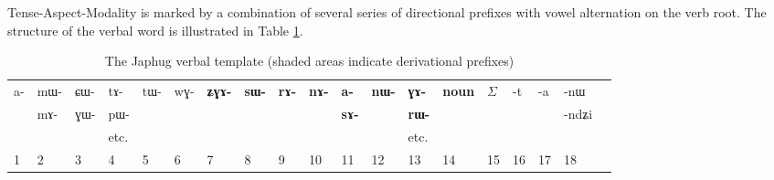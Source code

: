 \documentclass[oldfontcommands,twoside,a4paper,12pt]{article}
\newcommand{\ipab}[1]{{\phon #1}}
\newcommand{\grise}[1]{\cellcolor{lightgray}\textbf{#1}}
\begin{document}
 Tense-Aspect-Modality is marked by a combination of several series of directional prefixes with vowel alternation on the verb root. The structure of the verbal word is illustrated in Table \ref{tab:template:derivational}.
 
   \begin{landscape}
\begin{table}[h]
\caption{The Japhug verbal template (shaded areas indicate derivational prefixes)}\label{tab:template:derivational}
\begin{tabular}{llllll|llllllll|lllll} \toprule
 
\ipab{a-}  &  	\ipab{mɯ- }   &  	\ipab{ɕɯ-}   &\ipab{tɤ-} &  	\ipab{tɯ-}  &  	\ipab{wɣ-}   &

  	 \grise{\ipab{ʑɣɤ-}}  &  	\grise{\ipab{sɯ-}}  & \grise{\ipab{rɤ-}}& \grise{\ipab{nɤ-}} &   	 \grise{\ipab{a-}}   &  	\grise{\ipab{nɯ-}}  &  	\grise{\ipab{ɣɤ-}}  &  	\grise{\ipab{noun}}    &  	 \begin{math}\Sigma\end{math}    &  	\ipab{-t}  &  	\ipab{-a}  &  	\ipab{-nɯ}   &  \\
   &  	\ipab{mɤ-}   &  	\ipab{ɣɯ-}   &\ipab{pɯ-}&  	  &  	 
    & \grise{ }	  &  	 \grise{ }	  &  	  \grise{ }	  &  	   \grise{ }	&  	\grise{\ipab{sɤ-}}&  \grise{ }	 &  	\grise{\ipab{rɯ-}}  &  	 \grise{ }	  &  	  &  	  &  	  &  	\ipab{-ndʑi} &  \\
  &  	   &     &  etc.	  & & 	  &  	  &  	 & &  	  &  	 & &  etc.	  &  	  &  	  &  	  &  	  &  	  &  \\
1  &  	2  &  	3  &  	4  &  	5  &  	6  &  	7  &  	8  &  	9  &  	10  &  	11  &  	12  &  	13  &  	14  &  	15  & 16 &17&18\\
\bottomrule
\end{tabular}
\end{table}
\begin{multicols}{2}
\begin{enumerate}



\end{enumerate}
\end{multicols}
\end{landscape}
\end{document}
